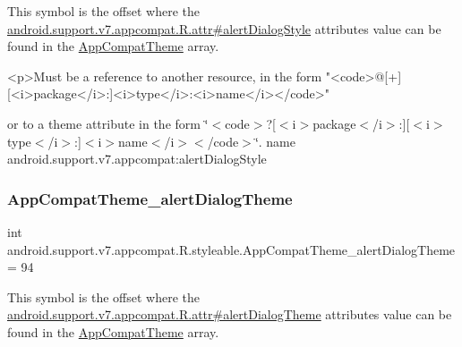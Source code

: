 This symbol is the offset where the \hyperlink{classandroid_1_1support_1_1v7_1_1appcompat_1_1R_1_1attr_a042bf450c17c2f3a1a989383edb17c70}{android.\+support.\+v7.\+appcompat.\+R.\+attr\#alert\+Dialog\+Style} attribute\textquotesingle{}s value can be found in the \hyperlink{classandroid_1_1support_1_1v7_1_1appcompat_1_1R_1_1styleable_a5c42f89e8a410c323be34208d75c430b}{App\+Compat\+Theme} array.

\begin{DoxyVerb}      <p>Must be a reference to another resource, in the form "<code>@[+][<i>package</i>:]<i>type</i>:<i>name</i></code>"
\end{DoxyVerb}
 or to a theme attribute in the form \char`\"{}$<$code$>$?\mbox{[}$<$i$>$package$<$/i$>$\+:\mbox{]}\mbox{[}$<$i$>$type$<$/i$>$\+:\mbox{]}$<$i$>$name$<$/i$>$$<$/code$>$\char`\"{}.  name android.\+support.\+v7.\+appcompat\+:alert\+Dialog\+Style \mbox{\label{classandroid_1_1support_1_1v7_1_1appcompat_1_1R_1_1styleable_a5bc1ecd8175fad8bacd655f7fa16ed65}} 
\subsubsection{\texorpdfstring{App\+Compat\+Theme\+\_\+alert\+Dialog\+Theme}{AppCompatTheme\_alertDialogTheme}}
{\footnotesize\ttfamily int android.\+support.\+v7.\+appcompat.\+R.\+styleable.\+App\+Compat\+Theme\+\_\+alert\+Dialog\+Theme = 94\hspace{0.3cm}{\ttfamily [static]}}

This symbol is the offset where the \hyperlink{classandroid_1_1support_1_1v7_1_1appcompat_1_1R_1_1attr_a598b5c765c91688704f66e15a7a0a7f6}{android.\+support.\+v7.\+appcompat.\+R.\+attr\#alert\+Dialog\+Theme} attribute\textquotesingle{}s value can be found in the \hyperlink{classandroid_1_1support_1_1v7_1_1appcompat_1_1R_1_1styleable_a5c42f89e8a410c323be34208d75c430b}{App\+Compat\+Theme} array.


